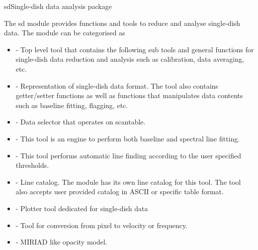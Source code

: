 \begin{ahmodule}{sd}{Single-dish data analysis package}

\begin{ahdescription}

The sd module provides functions and tools to reduce and analyse 
single-dish data. 
The module can be categorised as 

\begin{itemize}

\item {} - Top level tool that contains the following sub 
tools and general functions for single-dish data reduction 
and analysis such as calibration, data averaging, etc. 

\item {} - Representation of single-dish data 
format. The tool also contains getter/setter functions as well as functions 
that manipulates data contents such as baseline fitting, flagging, etc. 

\item {} - Data selector that operates on 
scantable.

\item {} - This tool is an engine to perform both 
baseline and spectral line fitting.

\item {} - This tool performs automatic 
line finding according to the user specified thresholds.

\item {} - Line catalog. The module has 
its own line catalog for this tool. The tool also accepts user provided 
catalog in ASCII or specific table format.

\item {} - Plotter tool dedicated for 
single-dish data


\item {} - Tool for conversion from pixel to 
velocity or frequency.


\item {} - MIRIAD like opacity model.

\end{itemize}


\end{ahdescription}

\ahobjs{}
\ahfuncs{}



\end{ahmodule}
